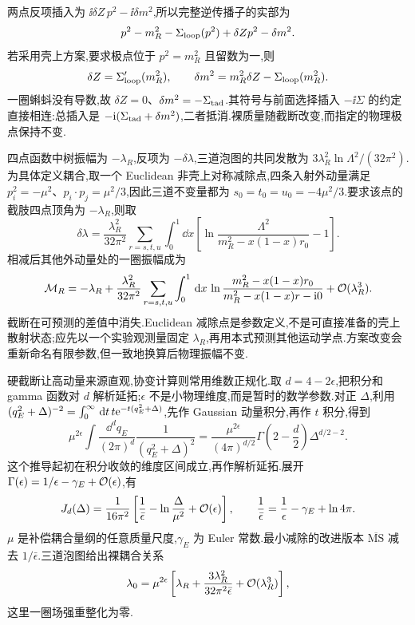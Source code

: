 两点反项插入为 $\ii\delta Z\,p^2-\ii\delta m^2$,所以完整逆传播子的实部为
\begin{equation}
 p^2-m_R^2-\Sigma_{\rm loop}(p^2)+\delta Zp^2-\delta m^2.
\end{equation}
若采用壳上方案,要求极点位于 $p^2=m_R^2$ 且留数为一,则
\begin{equation}
 \delta Z=\Sigma'_{\rm loop}(m_R^2),
 \qquad\delta m^2=m_R^2\delta Z-\Sigma_{\rm loop}(m_R^2).
\end{equation}
一圈蝌蚪没有导数,故 $\delta Z=0$、$\delta m^2=-\Sigma_{\rm tad}$.其符号与前面选择插入 $-\ii\Sigma$ 的约定直接相连:总插入是 $-\mathrm i(\Sigma_{\rm tad}+\delta m^2)$,二者抵消.裸质量随截断改变,而指定的物理极点保持不变.

四点函数中树振幅为 $-\lambda_R$,反项为 $-\delta\lambda$,三道泡图的共同发散为
$3\lambda_R^2\ln\Lambda^2/(32\pi^2)$.为具体定义耦合,取一个 Euclidean 非壳上对称减除点,四条入射外动量满足 $p_i^2=-\mu^2$、$p_i\cdot p_j=\mu^2/3$,因此三道不变量都为 $s_0=t_0=u_0=-4\mu^2/3$.要求该点的截肢四点顶角为 $-\lambda_R$,则取
\begin{equation}
 \delta\lambda=\frac{\lambda_R^2}{32\pi^2}
 \sum_{r=s,t,u}\int_0^1\dd x
 \left[\ln\frac{\Lambda^2}{m_R^2-x(1-x)r_0}-1\right].
\end{equation}
相减后其他外动量处的一圈振幅成为
\begin{equation}
 \mathcal M_R=-\lambda_R+
 \frac{\lambda_R^2}{32\pi^2}\sum_{r=s,t,u}\int_0^1\,\mathrm d x\,
 \ln\frac{m_R^2-x(1-x)r_0}{m_R^2-x(1-x)r-\mathrm i0}
 +\mathcal O(\lambda_R^3).
 \label{eq:phi4-subtracted}
\end{equation}
截断在可预测的差值中消失.Euclidean 减除点是参数定义,不是可直接准备的壳上散射状态;应先以一个实验观测量固定 $\lambda_R$,再用本式预测其他运动学点.方案改变会重新命名有限参数,但一致地换算后物理振幅不变.


硬截断让高动量来源直观,协变计算则常用维数正规化.取 $d=4-2\epsilon$,把积分和 gamma 函数对 $d$ 解析延拓;$\epsilon$ 不是小物理维度,而是暂时的数学参数.对正 $\Delta$,利用
$(q_E^2+\Delta)^{-2}=\int_0^\infty\,\mathrm d t\,t\mathrm e^{-t(q_E^2+\Delta)}$,先作 Gaussian 动量积分,再作 $t$ 积分,得到
\begin{equation}
 \mu^{2\epsilon}\int\frac{\dd^dq_E}{(2\pi)^d}
 \frac1{(q_E^2+\Delta)^2}
 =\frac{\mu^{2\epsilon}}{(4\pi)^{d/2}}
 \Gamma\left(2-\frac d2\right)\Delta^{d/2-2}.
\end{equation}
这个推导起初在积分收敛的维度区间成立,再作解析延拓.展开 $\Gamma(\epsilon)=1/\epsilon-\gamma_E+\mathcal O(\epsilon)$,有
\begin{equation}
 J_d(\Delta)=\frac1{16\pi^2}
 \left[\frac1{\bar\epsilon}-\ln\frac\Delta{\mu^2}+\mathcal O(\epsilon)\right],
 \qquad\frac1{\bar\epsilon}=\frac1\epsilon-\gamma_E+\ln4\pi.
\end{equation}
$\mu$ 是补偿耦合量纲的任意质量尺度,$\gamma_E$ 为 Euler 常数.最小减除的改进版本 $\overline{\mathrm{MS}}$ 减去 $1/\bar\epsilon$.三道泡图给出裸耦合关系
\begin{equation}
 \lambda_0=\mu^{2\epsilon}
 \left[\lambda_R+\frac{3\lambda_R^2}{32\pi^2\bar\epsilon}
 +\mathcal O(\lambda_R^3)\right],
 \label{eq:bare-lambda-dr}
\end{equation}
这里一圈场强重整化为零.

